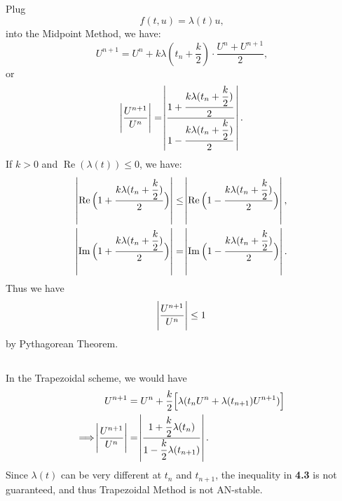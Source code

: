 \documentclass[11pt]{article}
\begin{document}
\subsection{}

\subsection{}

\subsection{}
Plug
\begin{equation}
    f(t, u) = \lambda(t)u,
\nonumber\end{equation}
into the Midpoint Method, we have:
\begin{equation}
    U^{n+1} = U^n + k\lambda(t_n + \dfrac k2)\cdot\dfrac{U^n+U^{n+1}}2,
\nonumber\end{equation}
or
\begin{equation}
    \abs{\dfrac{U^{n+1}}{U^n}} =
    \abs{\dfrac{1+\dfrac{k\lambda(t_n+\dfrac k2)}2}{1-\dfrac{k\lambda(t_n+\dfrac k2)}2}}.
\end{equation}
If $k>0$ and $\operatorname{Re}(\lambda(t)) \leq 0$, we have:
\begin{equation}\begin{split}
    \abs{\operatorname{Re}\Big(1+\dfrac{k\lambda(t_n+\dfrac k2)}2\Big)}
    &\leq\abs{\operatorname{Re}\Big(1-\dfrac{k\lambda(t_n+\dfrac k2)}2\Big)},\\
    \abs{\operatorname{Im}\Big(1+\dfrac{k\lambda(t_n+\dfrac k2)}2\Big)}
    &=\abs{\operatorname{Im}\Big(1-\dfrac{k\lambda(t_n+\dfrac k2)}2\Big)}.
\end{split}\end{equation}
Thus we have
\begin{equation}
    \abs{\dfrac{U^{n+1}}{U^n}} \leq 1
\end{equation}
by Pythagorean Theorem.

\subsection{}
In the Trapezoidal scheme, we would have 
\begin{equation}\begin{split}
    U^{n+1} &= U^n + \dfrac k2 \Big[ \lambda(t_nU^n + \lambda(t_{n+1})U^{n+1})\Big]\\
    \Longrightarrow
    \abs{\dfrac{U^{n+1}}{U^n}} &= \abs{\dfrac{1+\dfrac k2\lambda(t_n)}
        {1-\dfrac k2 \lambda(t_{n+1})}}.
\end{split}\end{equation}
Since $\lambda(t)$ can be very different at $t_n$ and $t_{n+1}$, 
the inequality in \textbf{4.3} is not guaranteed, and thus Trapezoidal Method is not AN-stable.
\end{document}
